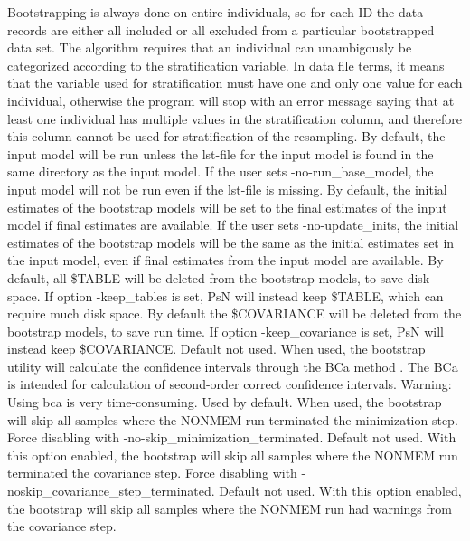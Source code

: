 \begin{optionlist}
Bootstrapping is always done on entire individuals, so for each ID the data records are either all included or all excluded from a particular bootstrapped data set.
The algorithm requires that an individual can unambigously be categorized according to the stratification variable. 
In data file terms, it means that the variable used for stratification must have one and only one value for each individual, otherwise the program will stop with an error message saying that at least one individual has multiple values
in the stratification column, and therefore this column cannot be used for stratification of the resampling.
\nextopt
{}
By default, the input model will be run unless the lst-file for the input model is found in the same directory as the input model.
If the user sets -no-run\_base\_model, the input model will not be run even if the lst-file is missing.
By default, the initial estimates of the bootstrap models will be set to the final estimates of the input model if final
estimates are available. If the user sets -no-update\_inits, the initial estimates of the bootstrap models will be
the same as the initial estimates set in the input model, even if final estimates from the input model are available.
By default, all \$TABLE will be deleted from the bootstrap models, to save disk space. If option -keep\_tables is set, 
PsN will instead keep \$TABLE, which can require much disk space.
\nextopt
{}
By default the \$COVARIANCE will be deleted from the bootstrap models, 
to save run time. If option -keep\_covariance is set, 
PsN will instead keep \$COVARIANCE.
\nextopt
{}
Default not used. When used, the bootstrap utility will calculate the confidence intervals through the BCa method \cite{Efron}. The BCa is intended for calculation of second-order correct confidence intervals. Warning: Using bca is very time-consuming. 
\nextopt
{}
Used by default. When used, the bootstrap will skip all samples where the NONMEM run terminated the minimization step. Force disabling with -no-skip\_minimization\_terminated. 
\nextopt
{}
Default not used. With this option enabled, the bootstrap will skip all samples
      where the NONMEM run terminated the covariance step.
      Force disabling with -no\-skip\_covariance\_step\_terminated.
\nextopt
{}
Default not used. With this option enabled, the bootstrap will skip all samples
      where the NONMEM run had warnings from the covariance step.

\end{optionlist}
